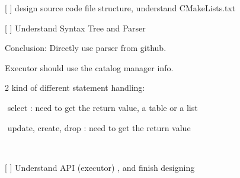 
\begin{DoxyItemize}
\item \mbox{[} \mbox{]} design source code file structure, understand {\ttfamily C\+Make\+Lists.\+txt}
\item \mbox{[} \mbox{]} Understand Syntax Tree and Parser

Conclusion\+: Directly use parser from github.

Executor should use the catalog manager info.

2 kind of different statement handling\+:

​ select \+: need to get the return value, a table or a list

​ update, create, drop \+: need to get the return value

​
\item \mbox{[} \mbox{]} Understand A\+PI (executor) , and finish designing 
\end{DoxyItemize}